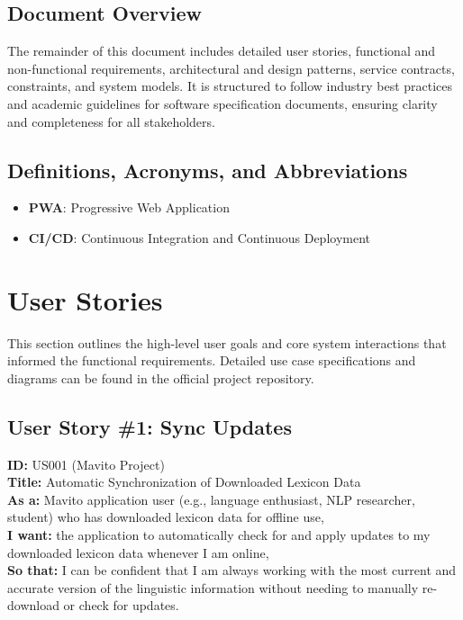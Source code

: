 \documentclass[12pt]{article}
\begin{document}
\subsection{Document Overview}
The remainder of this document includes detailed user stories, functional and non-functional requirements, architectural and design patterns, service contracts, constraints, and system models. It is structured to follow industry best practices and academic guidelines for software specification documents, ensuring clarity and completeness for all stakeholders.

\subsection{Definitions, Acronyms, and Abbreviations}
\begin{itemize}
    \item \textbf{PWA}: Progressive Web Application
    \item \textbf{CI/CD}: Continuous Integration and Continuous Deployment
\end{itemize}


\section{User Stories}
This section outlines the high-level user goals and core system interactions that informed the functional requirements. Detailed use case specifications and diagrams can be found in the official project repository.

\subsection{User Story \#1: Sync Updates}

\textbf{ID:} US001 (Mavito Project) \\
\textbf{Title:} Automatic Synchronization of Downloaded Lexicon Data \\
\textbf{As a:} Mavito application user (e.g., language enthusiast, NLP researcher, student) who has downloaded lexicon data for offline use, \\
\textbf{I want:} the application to automatically check for and apply updates to my downloaded lexicon data whenever I am online, \\
\textbf{So that:} I can be confident that I am always working with the most current and accurate version of the linguistic information without needing to manually re-download or check for updates.
\end{document}

